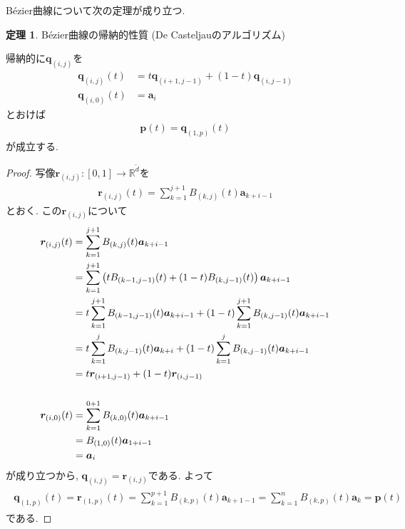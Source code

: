 \documentclass{jsarticle}
\newcommand\setR{\mathbb{R}}
\newcommand\Pare[1]{\left(#1\right)}
\theoremstyle{definition}%
\newtheorem{thm}{定理}
\begin{document}
\newpage
B\'ezier曲線について次の定理が成り立つ.
\begin{screen}
	\begin{thm}
		\label{Thm105}
		B\'ezier曲線の帰納的性質 (De Casteljauのアルゴリズム)

        帰納的に$\bm{q}_{(i,j)}$を
		\begin{align}
			\bm{q}_{(i,j)}(t)&=t\bm{q}_{(i+1,j-1)}+(1-t)\bm{q}_{(i,j-1)} \\
			\bm{q}_{(i,0)}(t)&=\bm{a}_i
		\end{align}
		とおけば
		\begin{align}
			\label{Eqn105}
			\bm{p}(t)=\bm{q}_{(1,p)}(t)
		\end{align}
		が成立する.
	\end{thm}
\end{screen}
\begin{proof}
	写像$\bm{r}_{(i,j)}:[0,1]\to \setR^{\tilde{d}}$を
	\begin{align}
		\bm{r}_{(i,j)}(t)
		=\sum_{k=1}^{j+1} B_{(k,j)}(t)\bm{a}_{k+i-1}
	\end{align}
    とおく.
    この$\bm{r}_{(i,j)}$について
    \begin{align}
        &\begin{aligned}
            \bm{r}_{(i,j)}(t)
            &=\sum_{k=1}^{j+1} B_{(k,j)}(t)\bm{a}_{k+i-1} \\
            &=\sum_{k=1}^{j+1} \Pare{tB_{(k-1,j-1)}(t)+(1-t)B_{(k,j-1)}(t)}\bm{a}_{k+i-1} \\
            &=t\sum_{k=1}^{j+1}B_{(k-1,j-1)}(t)\bm{a}_{k+i-1}+(1-t)\sum_{k=1}^{j+1}B_{(k,j-1)}(t)\bm{a}_{k+i-1} \\
            &=t\sum_{k=1}^{j} B_{(k,j-1)}(t)\bm{a}_{k+i}+(1-t)\sum_{k=1}^{j} B_{(k,j-1)}(t)\bm{a}_{k+i-1} \\
            &=t\bm{r}_{(i+1,j-1)}+(1-t)\bm{r}_{(i,j-1)}
        \end{aligned} \\ \notag \\
        &\begin{aligned}
            \bm{r}_{(i,0)}(t)
            &=\sum_{k=1}^{0+1} B_{(k,0)}(t)\bm{a}_{k+i-1} \\
            &=B_{(1,0)}(t)\bm{a}_{1+i-1} \\
            &=\bm{a}_{i}
        \end{aligned}
    \end{align}
    が成り立つから, $\bm{q}_{(i,j)}=\bm{r}_{(i,j)}$である.
    よって
    \begin{align}
        \begin{aligned}
            \bm{q}_{(1,p)}(t)
            =\bm{r}_{(1,p)}(t)
            =\sum_{k=1}^{p+1} B_{(k,p)}(t)\bm{a}_{k+1-1}
            =\sum_{k=1}^{n} B_{(k,p)}(t)\bm{a}_{k}
            =\bm{p}(t)
        \end{aligned}
    \end{align}
    である.
\end{proof}
\end{document}
